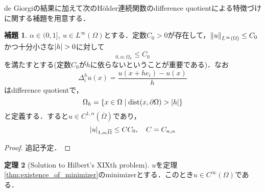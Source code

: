\documentclass[a4paper]{ltjsarticle}
\newcommand{\Om}{\Omega}
\newcommand{\pOm}{\partial\Omega}
\newcommand{\Ombar}{\overline{\Omega}}
\newcommand{\1}{\mathbbm{1}}
\DeclareMathOperator{\dist}{\mathrm{dist}}
\numberwithin{equation}{section}
\theoremstyle{definition}
\newtheorem{thm}{定理}[section]
\newtheorem{lem}[thm]{補題}
\begin{document}
de Giorgiの結果に加えて次のHölder連続関数のdifference quotientによる特徴づけに関する補題を用意する．
\begin{lem}
    $\alpha\in (0,1],\ u\in L^\infty(\Om)$とする．定数$C_0>0$が存在して，$\norm{u}_{L^\infty(\Om)}\leq C_0$かつ十分小さな$\abs{h}>0$に対して
    \begin{equation}
        [\Delta_i^h u]_{0,\alpha;\Om_h}\leq C_0  
    \end{equation}
    を満たすとする(定数$C_0$が$h$に依らないということが重要である)．なお
    \begin{equation}
        \Delta_i^h u(x)=\frac{u(x+he_i)-u(x)}{h}
    \end{equation}
    はdifference quotientで，
    \begin{equation}
        \Om_h=\qty{x\in \Om\mid \dist(x,\pOm)>\abs{h}}
    \end{equation}
    と定義する．すると$u\in C^{1,\alpha}(\Ombar)$であり，
    \begin{equation}
        \abs{u}_{1,\alpha;\Ombar}\leq CC_0,\quad C=C_{n,\alpha}
    \end{equation}
\end{lem}
\begin{proof}
    追記予定．
\end{proof}
\begin{thm}[Solution to Hilbert's XIXth problem]
    $u$を定理\ref{thm:existence_of_minimizer}のminimizerとする．このとき$u\in C^\infty(\Om)$である．
\end{thm}
\end{document}

